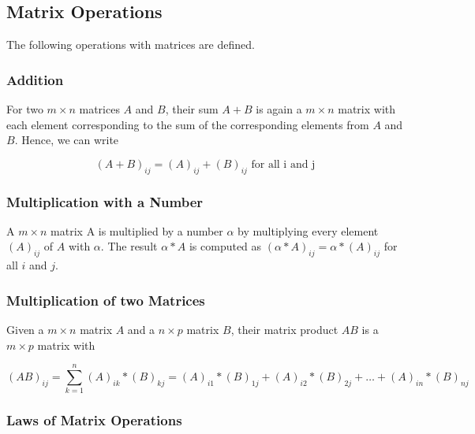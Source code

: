 \documentclass[
]{book}
\theoremstyle{definition}
\theoremstyle{definition}
\theoremstyle{definition}
\theoremstyle{remark}
\begin{document}
\hypertarget{intro-linalg-matrix-operation}{%
\subsection{Matrix Operations}\label{intro-linalg-matrix-operation}}

The following operations with matrices are defined.

\hypertarget{intro-linalg-matrix-addition}{%
\subsubsection{Addition}\label{intro-linalg-matrix-addition}}

For two \(m\times n\) matrices \(A\) and \(B\), their sum \(A+B\) is again a \(m\times n\) matrix with each element corresponding to the sum of the corresponding elements from \(A\) and \(B\). Hence, we can write

\[(A+B)_{ij} = (A)_{ij} + (B)_{ij} \text{ for all i and j}\]

\hypertarget{intro-linalg-matrix-multiplication-with-number}{%
\subsubsection{Multiplication with a Number}\label{intro-linalg-matrix-multiplication-with-number}}

A \(m\times n\) matrix A is multiplied by a number \(\alpha\) by multiplying every element \((A)_{ij}\) of \(A\) with \(\alpha\). The result \(\alpha * A\) is computed as \((\alpha * A)_{ij} = \alpha * (A)_{ij}\) for all \(i\) and \(j\).

\hypertarget{intro-linalg-multiplication-two-matrices}{%
\subsubsection{Multiplication of two Matrices}\label{intro-linalg-multiplication-two-matrices}}

Given a \(m\times n\) matrix \(A\) and a \(n\times p\) matrix \(B\), their matrix product \(AB\) is a \(m\times p\) matrix with

\[ (AB)_{ij} = \sum_{k=1}^n (A)_{ik} * (B)_{kj} = (A)_{i1} * (B)_{1j} + (A)_{i2} * (B)_{2j} + \ldots + (A)_{in} * (B)_{nj}\]

\hypertarget{intro-linalg-laws-matrix-operations}{%
\subsubsection{Laws of Matrix Operations}\label{intro-linalg-laws-matrix-operations}}
\end{document}
